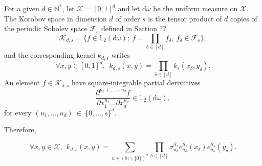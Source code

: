\documentclass[twoside,11pt]{book}
\numberwithin{theorem}{chapter}
\numberwithin{definition}{chapter}
\numberwithin{proposition}{chapter}
\numberwithin{corollary}{chapter}
\numberwithin{example}{chapter}
\numberwithin{lemma}{chapter}
\numberwithin{assumption}{chapter}
\begin{document}
For a given $d \in \mathbb{N}^{*}$, let $\mathcal{X} = [0,1]^{d}$ and let $\mathrm{d}\omega$ be the uniform measure on $\mathcal{X}$. The Korobov space in dimension $d$ of order $s$  is the tensor product of $d$ copies of the periodic Sobolev space $\mathcal{F}_{s}$ defined in Section ??
\begin{equation}
\mathcal{K}_{d,s} = \{ f \in \mathbb{L}_{2}(\mathrm{d}\omega); \: f = \prod\limits_{\delta \in [d]} f_{\delta}, \: f_{\delta} \in \mathcal{F}_{s} \},
\end{equation}
and the corresponding kernel $k_{d,s}$ writes
\begin{equation}
\forall x,y \in [0,1]^{d}, \:\: k_{d,s}(x,y) = \prod\limits_{\delta \in [d]}k_{s}(x_{\delta},y_{\delta}).
\end{equation}
An element $f \in \mathcal{K}_{d,s}$ have square-integrable partial derivatives 
\begin{equation}
\frac{\partial^{u_{1}+ \dots + u_{d}}f}{\partial x_{1}^{u_{1}} \dots \partial x_{d}^{u_{d}}} \in \mathbb{L}_{2}(\mathrm{d}\omega),
\end{equation}
for every $(u_{1}, \dots,u_{d})~\in~\{0, \dots, s\}^{d}$.




Therefore, 

\begin{equation}
\forall x,y \in \mathcal{X}, \:\:k_{d,s}(x,y) = \sum\limits_{u \in (\mathbb{N}\smallsetminus \{0\})^{d}} \prod\limits_{\delta \in [d]} \sigma_{u_{\delta}}^{\mathcal{S}_{s}} e_{u_{\delta}}^{\mathcal{S}_{s}}(x_{\delta}) e_{u_{\delta}}^{\mathcal{S}_{s}}(y_{\delta}).
\end{equation}



\end{document}
